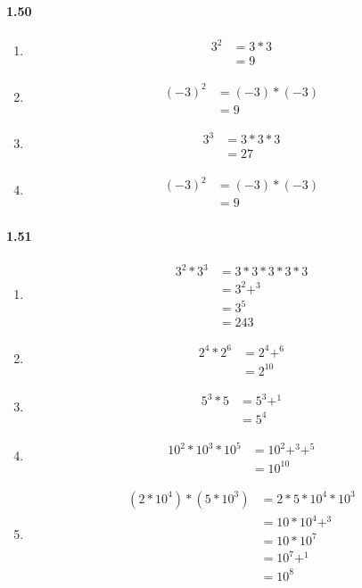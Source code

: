 \documentclass{article}
\newcommand\litem[1]{\item{\bfseries#1\space}}
\begin{document}
\paragraph{1.50}
\begin{enumerate}[label=\emph{\alph*})]
\litem{
\begin{align*}
  3^2 &= 3 * 3 \\
  &= 9
\end{align*}
}
\litem{
\begin{align*}
  (-3)^2 &= (-3) * (-3) \\
  &= 9
\end{align*}
}
\litem{
\begin{align*}
  3^3 &= 3 * 3 * 3 \\
  &= 27
\end{align*}
}
\litem{
\begin{align*}
  (-3)^2 &= (-3) * (-3) \\
  &= 9
\end{align*}
}
\end{enumerate}

\paragraph{1.51}
\begin{enumerate}[label=\emph{\alph*})]
\litem{
\begin{align*}
  3^2 * 3^3 &= 3 * 3 * 3 * 3 * 3 \\
  &=3^2+^3 \\
  &= 3^5 \\
  &=  243
\end{align*}
}
\litem{
\begin{align*}
  2^4 * 2^6 &= 2^4+^6 \\
  &= 2^10
\end{align*}
}
\litem{
\begin{align*}
  5^3 * 5 &= 5^3+^1 \\
  &= 5^4
\end{align*}
}
\litem{
\begin{align*}
  10^2 * 10^3 * 10^5 &= 10^2+^3+^5 \\
  &= 10^10
\end{align*}
}
\litem{
\begin{align*}
  (2 * 10^4) * (5 * 10^3) &= 2 * 5 * 10^4 * 10^3 \\
  &= 10 * 10^4+^3 \\
  &= 10 * 10^7 \\
  &= 10^7+^1 \\
  &= 10^8
\end{align*}
}
\end{enumerate}
\end{document}
